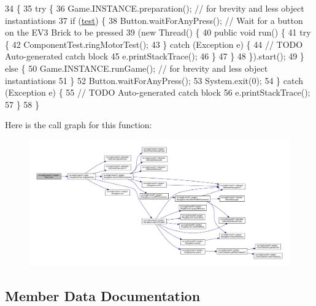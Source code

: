 \begin{DoxyCode}
34                                          \{
35     \textcolor{keywordflow}{try} \{
36       Game.INSTANCE.preparation(); \textcolor{comment}{// for brevity and less object instantiations}
37       \textcolor{keywordflow}{if} (\hyperlink{classca_1_1mcgill_1_1ecse211_1_1project_1_1_main_af6f7b8fffddcf855f74fe128d2e23ea1}{test}) \{
38         Button.waitForAnyPress(); \textcolor{comment}{// Wait for a button on the EV3 Brick to be pressed}
39         (\textcolor{keyword}{new} Thread() \{
40           \textcolor{keyword}{public} \textcolor{keywordtype}{void} run() \{
41             \textcolor{keywordflow}{try} \{
42               ComponentTest.ringMotorTest();
43             \} \textcolor{keywordflow}{catch} (Exception e) \{
44               \textcolor{comment}{// TODO Auto-generated catch block}
45               e.printStackTrace();
46             \}
47           \}
48         \}).start();
49       \} \textcolor{keywordflow}{else} \{
50         Game.INSTANCE.runGame(); \textcolor{comment}{// for brevity and less object instantiations}
51       \}
52       Button.waitForAnyPress();
53       System.exit(0);
54     \} \textcolor{keywordflow}{catch} (Exception e) \{
55       \textcolor{comment}{// TODO Auto-generated catch block}
56       e.printStackTrace();
57     \}
58   \}
\end{DoxyCode}
Here is the call graph for this function\+:
\nopagebreak
\begin{figure}[H]
\begin{center}
\leavevmode
\includegraphics[width=350pt]{classca_1_1mcgill_1_1ecse211_1_1project_1_1_main_af681b5dc675c13ed284071cc135f5fd3_cgraph}
\end{center}
\end{figure}


\subsection{Member Data Documentation}
\mbox{\label{classca_1_1mcgill_1_1ecse211_1_1project_1_1_main_af6f7b8fffddcf855f74fe128d2e23ea1}} 
